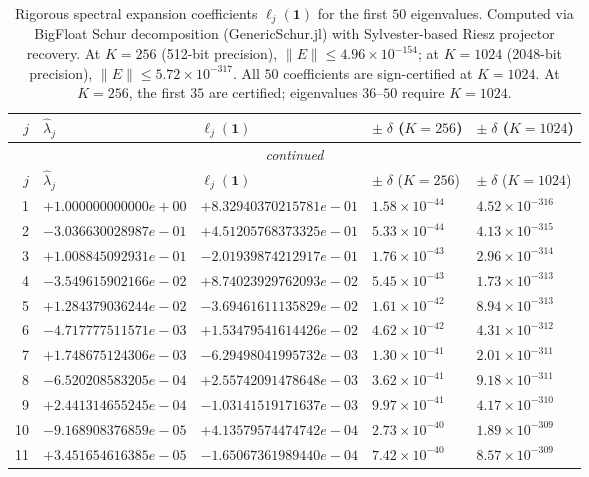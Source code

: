 \documentclass[11pt]{article}
\begin{document}
\begin{longtable}{rllll}
\caption{Rigorous spectral expansion coefficients $\ell_j(\mathbf{1})$ for the first $50$ eigenvalues.
Computed via BigFloat Schur decomposition (GenericSchur.jl) with Sylvester-based Riesz projector recovery.
At $K = 256$ (512-bit precision), $\|E\| \leq 4.96 \times 10^{-154}$;
at $K = 1024$ (2048-bit precision), $\|E\| \leq 5.72 \times 10^{-317}$.
All $50$ coefficients are sign-certified at $K = 1024$.
At $K = 256$, the first $35$ are certified; eigenvalues $36$--$50$ require $K = 1024$.}
\label{tab:spectral-coefficients}\\
\toprule
$j$ & $\hat\lambda_j$ & $\ell_j(\mathbf{1})$ & $\pm\;\delta$ ($K\!=\!256$) & $\pm\;\delta$ ($K\!=\!1024$) \\
\midrule
\endfirsthead
\multicolumn{5}{c}{\textit{continued}} \\
\toprule
$j$ & $\hat\lambda_j$ & $\ell_j(\mathbf{1})$ & $\pm\;\delta$ ($K\!=\!256$) & $\pm\;\delta$ ($K\!=\!1024$) \\
\midrule
\endhead
1 & $+1.000000000000e+00$ & $+8.32940370215781e-01$ & $1.58 \times 10^{-44}$ & $4.52 \times 10^{-316}$ \\
2 & $-3.036630028987e-01$ & $+4.51205768373325e-01$ & $5.33 \times 10^{-44}$ & $4.13 \times 10^{-315}$ \\
3 & $+1.008845092931e-01$ & $-2.01939874212917e-01$ & $1.76 \times 10^{-43}$ & $2.96 \times 10^{-314}$ \\
4 & $-3.549615902166e-02$ & $+8.74023929762093e-02$ & $5.45 \times 10^{-43}$ & $1.73 \times 10^{-313}$ \\
5 & $+1.284379036244e-02$ & $-3.69461611135829e-02$ & $1.61 \times 10^{-42}$ & $8.94 \times 10^{-313}$ \\
6 & $-4.717777511571e-03$ & $+1.53479541614426e-02$ & $4.62 \times 10^{-42}$ & $4.31 \times 10^{-312}$ \\
7 & $+1.748675124306e-03$ & $-6.29498041995732e-03$ & $1.30 \times 10^{-41}$ & $2.01 \times 10^{-311}$ \\
8 & $-6.520208583205e-04$ & $+2.55742091478648e-03$ & $3.62 \times 10^{-41}$ & $9.18 \times 10^{-311}$ \\
9 & $+2.441314655245e-04$ & $-1.03141519171637e-03$ & $9.97 \times 10^{-41}$ & $4.17 \times 10^{-310}$ \\
10 & $-9.168908376859e-05$ & $+4.13579574474742e-04$ & $2.73 \times 10^{-40}$ & $1.89 \times 10^{-309}$ \\
11 & $+3.451654616385e-05$ & $-1.65067361989440e-04$ & $7.42 \times 10^{-40}$ & $8.57 \times 10^{-309}$ \\

\end{longtable}
\end{document}
